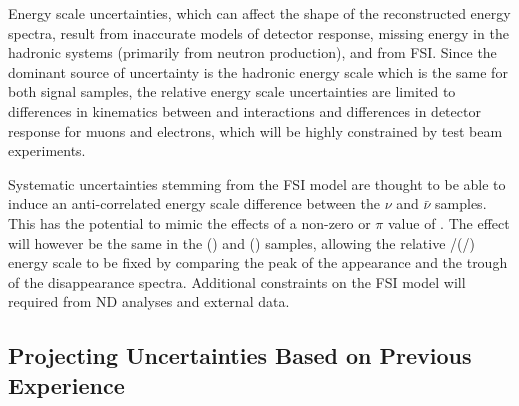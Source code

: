 
Energy scale uncertainties, which can affect the shape of the reconstructed energy spectra, result from
inaccurate models of detector response, missing energy in the hadronic systems (primarily from neutron production),
and from FSI. Since the dominant source of uncertainty is the hadronic energy scale which is the same for both
signal samples, the relative energy scale uncertainties are limited to differences in kinematics
between \numu and \nue interactions and differences in detector response for muons and electrons,
which will be highly constrained by test beam experiments.

Systematic uncertainties stemming from the FSI model are thought to be able to induce an anti-correlated 
energy scale difference between the $\nu$ and $\bar\nu$ samples. This has the potential to mimic the effects
of a non-zero or $\pi$ value of \deltacp. The effect will however be the same in the \nue (\anue) and \numu
(\anumu) samples, allowing the relative \nue/\numu (\anue/\anumu) energy scale to be fixed by comparing
the peak of the appearance and the trough of the disappearance spectra. Additional constraints on the FSI 
model will required from ND analyses and external data.

\subsection{Projecting Uncertainties Based on Previous Experience}

